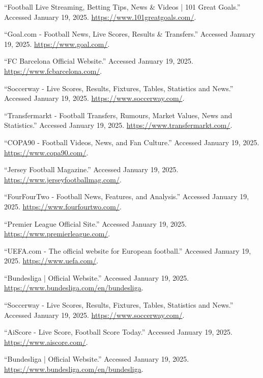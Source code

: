 \documentclass{report}
\begin{document}

\begin{thebibliography}{24}
``Football Live Streaming, Betting Tips, News \& Videos | 101 Great Goals.'' Accessed January 19, 2025. \url{https://www.101greatgoals.com/}.

``Goal.com - Football News, Live Scores, Results & Transfers.'' Accessed January 19, 2025. \url{https://www.goal.com/}.

``FC Barcelona Official Website.'' Accessed January 19, 2025. \url{https://www.fcbarcelona.com/}.

``Soccerway - Live Scores, Results, Fixtures, Tables, Statistics and News.'' Accessed January 19, 2025. \url{https://www.soccerway.com/}.

``Transfermarkt - Football Transfers, Rumours, Market Values, News and Statistics.'' Accessed January 19, 2025. \url{https://www.transfermarkt.com/}.

``COPA90 - Football Videos, News, and Fan Culture.'' Accessed January 19, 2025. \url{https://www.copa90.com/}.

``Jersey Football Magazine.'' Accessed January 19, 2025. \url{https://www.jerseyfootballmag.com/}.

``FourFourTwo - Football News, Features, and Analysis.'' Accessed January 19, 2025. \url{https://www.fourfourtwo.com/}.

``Premier League Official Site.'' Accessed January 19, 2025. \url{https://www.premierleague.com/}.

``UEFA.com - The official website for European football.'' Accessed January 19, 2025. \url{https://www.uefa.com/}.

``Bundesliga | Official Website.'' Accessed January 19, 2025. \url{https://www.bundesliga.com/en/bundesliga}.

``Soccerway - Live Scores, Results, Fixtures, Tables, Statistics and News.'' Accessed January 19, 2025. \url{https://www.soccerway.com/}.

``AiScore - Live Score, Football Score Today.'' Accessed January 19, 2025. \url{https://www.aiscore.com/}.

``Bundesliga | Official Website.'' Accessed January 19, 2025. \url{https://www.bundesliga.com/en/bundesliga}.


\end{thebibliography}
\end{document}
